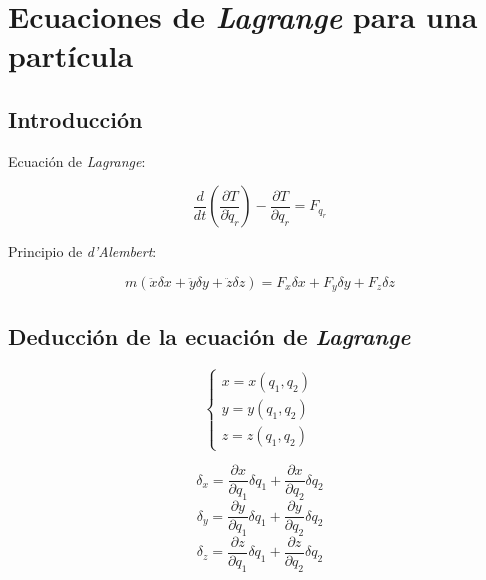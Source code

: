 \chapter{Ecuaciones de \emph{Lagrange} para una partícula}

\section{Introducción}

Ecuación de \emph{Lagrange}:

\begin{equation*}
    \frac{d}{dt}\left(\frac{\partial T}{\partial \dot{q}_r}\right)-
    \frac{\partial T}{\partial q_r}=F_{q_r}
\end{equation*}

Principio de \emph{d'Alembert}:

\begin{equation*}
    m(\ddot{x}\delta x+\ddot{y}\delta y+\ddot{z}\delta z)=
    F_x\delta x+F_y\delta y+F_z\delta z
\end{equation*}

\section{Deducción de la ecuación de \emph{Lagrange}}

\begin{equation*}
    \begin{cases}
        x=x(q_1,q_2)\\
        y=y(q_1,q_2)\\
        z=z(q_1,q_2)
    \end{cases}
\end{equation*}

\begin{equation*}
    \delta_x=\frac{\partial x}{\partial q_1}\delta q_1+
             \frac{\partial x}{\partial q_2}\delta q_2
\end{equation*}
\begin{equation*}
    \delta_y=\frac{\partial y}{\partial q_1}\delta q_1+
             \frac{\partial y}{\partial q_2}\delta q_2
\end{equation*}
\begin{equation*}
    \delta_z=\frac{\partial z}{\partial q_1}\delta q_1+
             \frac{\partial z}{\partial q_2}\delta q_2
\end{equation*}

